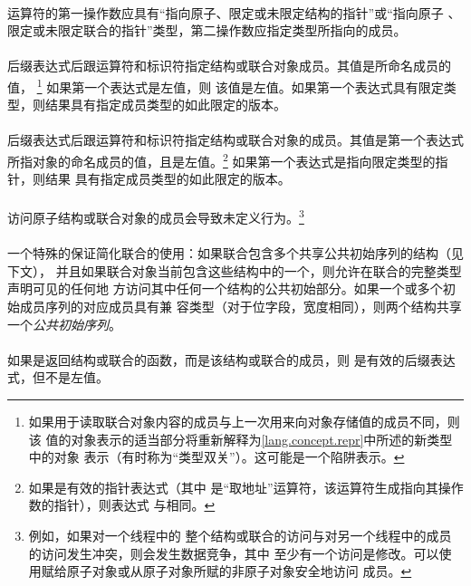{\paragraph{}
运算符\tm{->}的第一操作数应具有``指向原子、限定或未限定结构的指针''或``指向原子
、限定或未限定联合的指针''类型，第二操作数应指定类型所指向的成员。

\semantic
\paragraph{}
后缀表达式后跟运算符和标识符指定结构或联合对象成员。其值是所命名成员的值，
\footnote{如果用于读取联合对象内容的成员与上一次用来向对象存储值的成员不同，则该
值的对象表示的适当部分将重新解释为\ref{lang.concept.repr}中所述的新类型中的对象
表示（有时称为``类型双关''）。这可能是一个陷阱表示。} 如果第一个表达式是左值，则
该值是左值。如果第一个表达式具有限定类型，则结果具有指定成员类型的如此限定的版本。

\paragraph{}
后缀表达式后跟\tm{->}运算符和标识符指定结构或联合对象的成员。其值是第一个表达式
所指对象的命名成员的值，且是左值。\footnote{如果是有效的指针表达式（其中
\tm{\&}是``取地址''运算符，该运算符生成指向其操作数的指针），则表达式
与相同。} 如果第一个表达式是指向限定类型的指针，则结果
具有指定成员类型的如此限定的版本。

\paragraph{}
访问原子结构或联合对象的成员会导致未定义行为。\footnote{例如，如果对一个线程中的
整个结构或联合的访问与对另一个线程中的成员的访问发生冲突，则会发生数据竞争，其中
至少有一个访问是修改。可以使用赋给原子对象或从原子对象所赋的非原子对象安全地访问
成员。}

\paragraph{}
一个特殊的保证简化联合的使用：如果联合包含多个共享公共初始序列的结构（见下文），
并且如果联合对象当前包含这些结构中的一个，则允许在联合的完整类型声明可见的任何地
方访问其中任何一个结构的公共初始部分。如果一个或多个初始成员序列的对应成员具有兼
容类型（对于位字段，宽度相同），则两个结构共享一个\textit{公共初始序列}。

\paragraph{}
\ex 如果是返回结构或联合的函数，而是该结构或联合的成员，则
是有效的后缀表达式，但不是左值。

}
